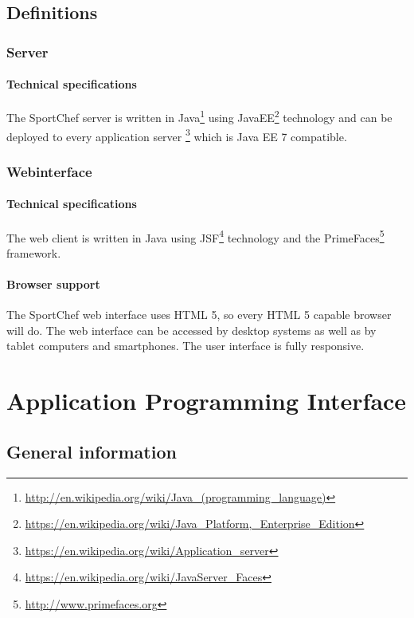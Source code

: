 \documentclass[a4paper,openright,twoside]{report}
\begin{document}
\section{Definitions}

\subsection{Server}

\subsubsection{Technical specifications}
The SportChef server is written in Java\footnote{\url{http://en.wikipedia.org/wiki/Java_(programming_language)}} using JavaEE\footnote{\url{https://en.wikipedia.org/wiki/Java_Platform,_Enterprise_Edition}} technology and can be deployed to every application server \footnote{\url{https://en.wikipedia.org/wiki/Application_server}} which is Java EE 7 compatible.

\subsection{Webinterface}

\subsubsection{Technical specifications}
The web client is written in Java using JSF\footnote{\url{https://en.wikipedia.org/wiki/JavaServer_Faces}} technology and the PrimeFaces\footnote{\url{http://www.primefaces.org}} framework.

\subsubsection{Browser support}
The SportChef web interface uses HTML 5, so every HTML 5 capable browser will do. The web interface can be accessed by desktop systems as well as by tablet computers and smartphones. The user interface is fully responsive.

\chapter{Application Programming Interface}

\section{General information}
\end{document}
